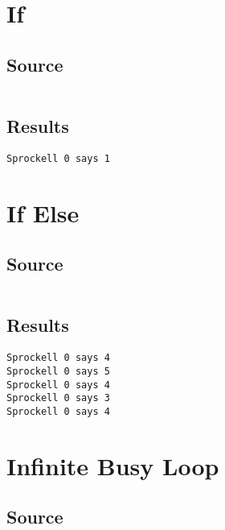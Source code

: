 \documentclass[twoside]{report}
\begin{document}
\section{If}
\subsection{Source}
\inputminted[tabsize=4,linenos,firstnumber=1]{text}{../../src/haskell/PP-project-2017/test/if.shl}
\subsection{Results}
\begin{verbatim}
Sprockell 0 says 1
\end{verbatim}

\section{If Else}
\subsection{Source}
\inputminted[tabsize=4,linenos,firstnumber=1]{text}{../../src/haskell/PP-project-2017/test/ifelse.shl}
\subsection{Results}
\begin{verbatim}
Sprockell 0 says 4
Sprockell 0 says 5
Sprockell 0 says 4
Sprockell 0 says 3
Sprockell 0 says 4
\end{verbatim}

\section{Infinite Busy Loop}
\subsection{Source}
\inputminted[tabsize=4,linenos,firstnumber=1]{text}{../../src/haskell/PP-project-2017/test/infinite_busy_loop.shl}
\end{document}

